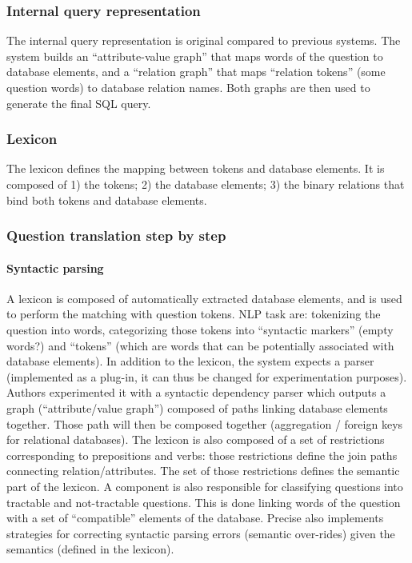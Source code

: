 \documentclass[10pt,journal,letterpaper,compsoc]{IEEEtran}
\begin{document}
\subsubsection{Internal query representation}
The internal query representation is original compared to previous systems. 
The system builds an ``attribute-value graph'' that maps words of the question
to database elements, and a ``relation graph'' that maps ``relation tokens''
(some question words) to database relation names. Both graphs are then used to
generate the final SQL query.

\subsubsection{Lexicon}
The lexicon defines the mapping between tokens and database elements. It is
composed of 1) the tokens; 2) the database elements; 3) the binary relations
that bind both tokens and database elements. 

\subsubsection{Question translation step by step}
\paragraph{Syntactic parsing} A lexicon is composed of automatically
extracted database elements, and is used to perform the matching with
question tokens. NLP task are: tokenizing the question into words,
categorizing those tokens into ``syntactic markers'' (empty words?) and
``tokens'' (which are words that can be potentially associated with
database elements). 
In addition to the lexicon, the system expects a parser (implemented as a
plug-in, it can thus be changed for experimentation purposes).
Authors experimented it with a syntactic dependency parser which outputs a graph
(``attribute/value graph'') composed of paths linking database elements
together. Those path will then be composed together (aggregation / foreign keys
for relational databases).
The lexicon is also composed of a set of restrictions corresponding to
prepositions and verbs: those restrictions define the join paths connecting
relation/attributes. The set of those restrictions defines the semantic part
of the lexicon.
A component is also responsible for classifying
questions into tractable and not-tractable questions. This is done linking
words of the question with a set of ``compatible'' elements of the
database.
{\sc Precise} also implements strategies for correcting syntactic parsing
errors (semantic over-rides) given the semantics (defined in the lexicon).
\end{document}
